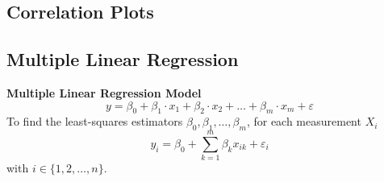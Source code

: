 \documentclass[11pt]{article}
\theoremstyle{definition}
\begin{document}
\subsection{Correlation Plots}

\subsection{Multiple Linear Regression}
\textbf{Multiple Linear Regression Model}
\begin{equation*}
	y = \beta_0 + \beta_1\cdot x_1 + \beta_2\cdot x_2 + \dots + \beta_m\cdot x_m + \varepsilon
\end{equation*}
To find the least-squares estimators $\beta_0,\beta_1,\dots,\beta_m$, for each measurement $X_i$
\begin{equation*}
	y_i = \beta_0 + \sum_{k=1}^{m}\beta_k x_{ik} + \varepsilon_i
\end{equation*}
with $i\in\{1,2,\dots,n\}$.
\end{document}
